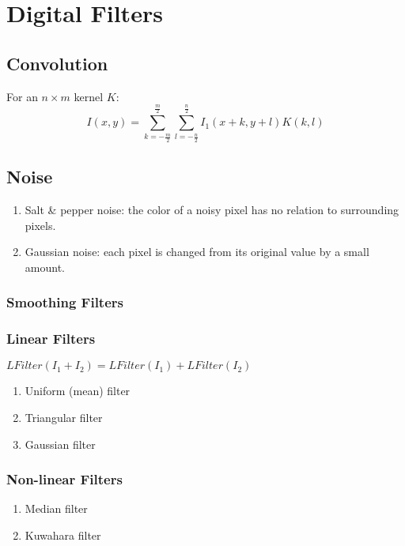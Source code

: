 \section{Digital Filters}
\subsection{Convolution}
For an $n\times m$ kernel $K$:
\[
I(x,y) = \sum_{k=-\frac{m}{2}}^{\frac{m}{2}}{\sum_{l=-\frac{n}{2}}^{\frac{n}{2}}{I_1(x+k,y+l)K(k,l)}}
\]
\subsection{Noise}
\begin{enumerate}
  \item Salt \& pepper noise: the color of a noisy pixel has no relation to surrounding pixels.
  \item Gaussian noise: each pixel is changed from its original value by a small amount.
\end{enumerate}
\subsubsection{Smoothing Filters}
\subsubsection{Linear Filters}
$LFilter(I_1 + I_2) = LFilter(I_1) + LFilter(I_2)$
\begin{enumerate}
  \item Uniform (mean) filter
  \item Triangular filter
  \item Gaussian filter
\end{enumerate}
\subsubsection{Non-linear Filters}
\begin{enumerate}
  \item Median filter
  \item Kuwahara filter
\end{enumerate}
